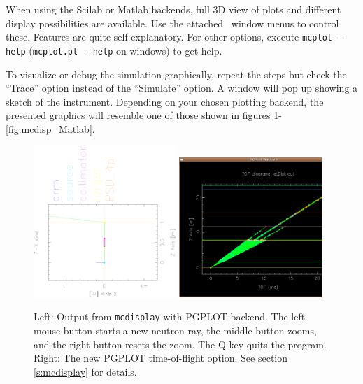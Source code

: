 When using the Scilab or Matlab backends, full 3D view of plots and different
display possibilities are available. Use the attached \MCS\ window menus to
control these. Features are quite self explanatory. For other options, execute
\verb+mcplot --help+ (\verb+mcplot.pl --help+ on windows) to get help.

   To visualize or
debug the simulation graphically, repeat the steps but check the ``Trace''
option instead of the ``Simulate'' option.  A window will pop up showing a
sketch of the instrument.  Depending on your chosen plotting backend, the
presented graphics will resemble one of those shown in figures
\ref{fig:mcdisp_PGPLOT}-\ref{fig:mcdisp_Matlab}.
\begin{figure}[htb!]
  \begin{center}
    \includegraphics[width=0.48\textwidth]{figures/mcdisplay_PGPLOT.ps}
    \includegraphics[width=0.48\textwidth]{figures/mcdisplay_TOF.ps}
  \end{center}
  \caption{Left: Output from \texttt{mcdisplay} with PGPLOT backend.  The left
    mouse button starts a new neutron ray, the middle button zooms, and the
    right button resets the zoom. The Q key quits the program. Right: The new
    PGPLOT time-of-flight option. See section \ref{s:mcdisplay} for details.}
\label{fig:mcdisp_PGPLOT}
\end{figure}
